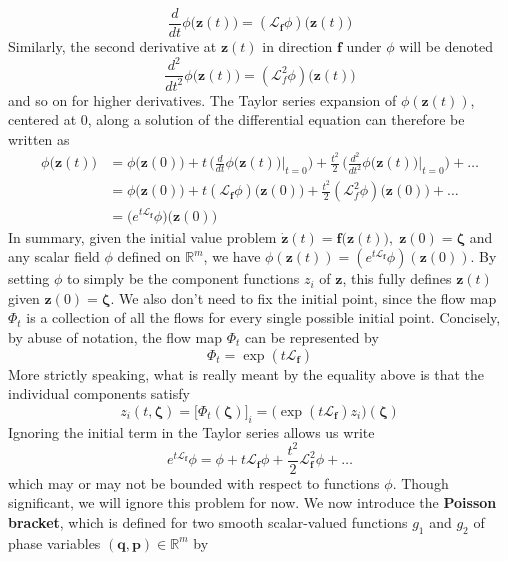 \documentclass{article}
\theoremstyle{remark}
\theoremstyle{definition}
\begin{document}
\[\frac{d}{dt} \phi\big(\mathbf{z}(t)\big) = ( \mathcal{L}_\mathbf{f} \phi) \big(\mathbf{z}(t) \big)\]
Similarly, the second derivative at $\mathbf{z}(t)$ in direction $\mathbf{f}$ under $\phi$ will be denoted 
\[\frac{d^2}{dt^2} \phi\big( \mathbf{z}(t) \big) = (\mathcal{L}_f^2 \phi) \big( \mathbf{z}(t) \big)\]
and so on for higher derivatives. The Taylor series expansion of $\phi(\mathbf{z}(t))$, centered at $0$, along a solution of the differential equation can therefore be written as 
\begin{align*}
    \phi \big(\mathbf{z}(t) \big) & = \phi \big(\mathbf{z}(0) \big) + t \, \bigg( \frac{d}{dt} \phi \big( \mathbf{z}(t)\big) \bigg|_{t = 0} \bigg) + \frac{t^2}{2} \, \bigg( \frac{d^2}{dt^2} \phi\big( \mathbf{z}(t)\big) \bigg|_{t = 0} \bigg) + \ldots \\
    & = \phi \big(\mathbf{z}(0) \big) + t (\mathcal{L}_\mathbf{f} \phi) \big( \mathbf{z}(0) \big) + \frac{t^2}{2} ( \mathcal{L}_f^2 \phi) \big( \mathbf{z}(0)\big) + \ldots \\
    & = \big( e^{t \mathcal{L}_\mathbf{f}} \phi) \big( \mathbf{z}(0)\big) 
\end{align*}
In summary, given the initial value problem $\mathbf{\dot{z}}(t) = \mathbf{f}\big( \mathbf{z}(t)\big), \; \mathbf{z}(0) = \boldsymbol{\zeta}$ and any scalar field $\phi$ defined on $\mathbb{R}^m$, we have $\phi( \mathbf{z}(t)) = ( e^{t \mathcal{L}_\mathbf{f}} \phi)(\mathbf{z}(0))$. By setting $\phi$ to simply be the component functions $z_i$ of $\mathbf{z}$, this fully defines $\mathbf{z}(t)$ given $\mathbf{z}(0) = \boldsymbol{\zeta}$. We also don't need to fix the initial point, since the flow map $\Phi_t$ is a collection of all the flows for every single possible initial point. Concisely, by abuse of notation, the flow map $\Phi_t$ can be represented by 
\[\Phi_t = \exp(t \mathcal{L}_\mathbf{f})\]
More strictly speaking, what is really meant by the equality above is that the individual components satisfy 
\[z_i (t, \boldsymbol{\zeta}) = \big[ \Phi_t (\boldsymbol{\zeta}) \big]_i = \big(\exp(t \mathcal{L}_\mathbf{f}) z_i \big) (\boldsymbol{\zeta})\]
Ignoring the initial term in the Taylor series allows us write 
\[e^{t \mathcal{L}_\mathbf{f}} \phi = \phi + t \mathcal{L}_\mathbf{f} \phi + \frac{t^2}{2} \mathcal{L}_\mathbf{f}^2 \phi + \ldots\]
which may or may not be bounded with respect to functions $\phi$. Though significant, we will ignore this problem for now. We now introduce the \textbf{Poisson bracket}, which is defined for two smooth scalar-valued functions $g_1$ and $g_2$ of phase variables $(\mathbf{q}, \mathbf{p}) \in \mathbb{R}^m$ by 
\end{document}
